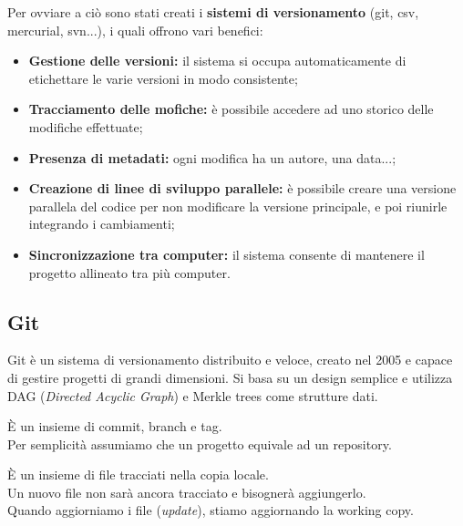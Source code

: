 \documentclass[12pt]{article}
\newcounter{definition}[section]
\begin{document}
    \begin{samepage}
      Per ovviare a ciò sono stati creati i \textbf{sistemi di versionamento} (git, csv, mercurial, svn...), i quali offrono vari benefici:
      \begin{itemize}
        \item \textbf{Gestione delle versioni:} il sistema si occupa automaticamente di etichettare le varie versioni in modo consistente;
        \item \textbf{Tracciamento delle mofiche:} è possibile accedere ad uno storico delle modifiche effettuate;
        \item \textbf{Presenza di metadati:} ogni modifica ha un autore, una data...;
        \item \textbf{Creazione di linee di sviluppo parallele:} è possibile creare una versione parallela del codice per non modificare la versione principale, e poi riunirle integrando i cambiamenti;
        \item \textbf{Sincronizzazione tra computer:} il sistema consente di mantenere il progetto allineato tra più computer.
      \end{itemize}
    \end{samepage}

    \subsection{Git}
    Git è un sistema di versionamento distribuito e veloce, creato nel 2005 e capace di gestire progetti di grandi dimensioni.
    Si basa su un design semplice e utilizza DAG (\textit{Directed Acyclic Graph}) e Merkle trees come strutture dati.
    \begin{definition}[Repository]
      È un insieme di commit, branch e tag.\\
      Per semplicità assumiamo che un progetto equivale ad un repository.
    \end{definition}
    \begin{definition}
      È un insieme di file tracciati nella copia locale.\\
      Un nuovo file non sarà ancora tracciato e bisognerà aggiungerlo.\\
      Quando aggiorniamo i file (\textit{update}), stiamo aggiornando la working copy.
    \end{definition}
    
\end{document}

